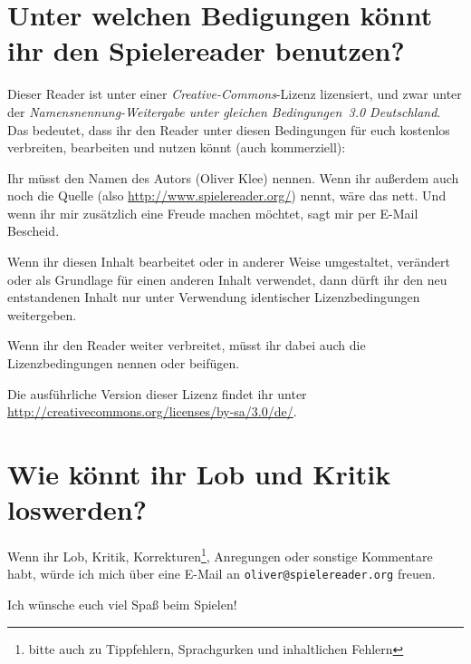 \section{Unter welchen Bedigungen könnt ihr den Spielereader benutzen?}
Dieser Reader ist unter einer \emph{Creative-Commons}-Lizenz lizensiert, und zwar unter der \emph{Namensnennung-Weitergabe unter gleichen Bedingungen~3.0 Deutschland}. Das bedeutet, dass ihr den Reader unter diesen Bedingungen für euch kostenlos verbreiten, bearbeiten und nutzen könnt (auch kommerziell):
\begin{description}
  \item[Namensnennung.] Ihr müsst den Namen des Autors (Oliver Klee) nennen. Wenn ihr außerdem auch noch die Quelle (also \url{http://www.spielereader.org/}) nennt, wäre das nett. Und wenn ihr mir zusätzlich eine Freude machen möchtet, sagt mir per E-Mail Bescheid.
  \item[Weitergabe unter gleichen Bedingungen.] Wenn ihr diesen Inhalt bearbeitet oder in anderer Weise umgestaltet, verändert oder als Grundlage für einen anderen Inhalt verwendet, dann dürft ihr den neu entstandenen Inhalt nur unter Verwendung identischer Lizenzbedingungen weitergeben.
  \item Wenn ihr den Reader weiter verbreitet, müsst ihr dabei auch die Lizenzbedingungen nennen oder beifügen.
\end{description}

Die ausführliche Version dieser Lizenz findet ihr unter \url{http://creativecommons.org/licenses/by-sa/3.0/de/}.

\section{Wie könnt ihr Lob und Kritik loswerden?}
Wenn ihr Lob, Kritik, Korrekturen\footnote{bitte auch zu Tippfehlern, Sprachgurken und inhaltlichen Fehlern}, Anregungen oder sonstige Kommentare habt, würde ich mich über eine E-Mail an \texttt{oliver@spielereader.org} freuen.

Ich wünsche euch viel Spaß beim Spielen!
